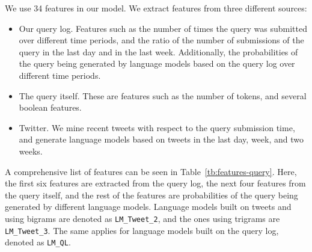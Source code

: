 We use 34 features in our model. We extract features from three different sources:
\begin{itemize}
	\item Our query log. Features such as the number of times the query was submitted over different time periods, and the ratio of the number of submissions of the query in the last day and in the last week. Additionally, the probabilities of the query being generated by language models based on the query log over different time periods.
    \item The query itself. These are features such as the number of tokens, and several boolean features.
    \item Twitter. We mine recent tweets with respect to the query submission time, and generate language models based on tweets in the last day, week, and two weeks.
\end{itemize}

A comprehensive list of features can be seen in Table~\ref{tb:features-query}. Here, the first six features are extracted from the query log, the next four features from the query itself, and the rest of the features are probabilities of the query being generated by different language models. Language models built on tweets and using bigrams are denoted as \texttt{LM\_Tweet\_2}, and the ones using trigrams are \texttt{LM\_Tweet\_3}. The same applies for language models built on the query log, denoted as \texttt{LM\_QL}.

